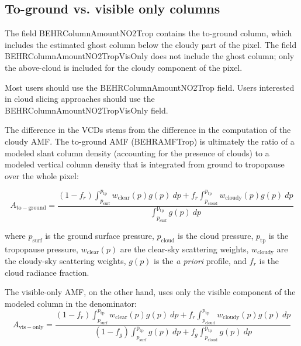 \documentclass[12pt]{article}
\begin{document}
	
	\subsection{To-ground vs. visible only columns}
	The field BEHRColumnAmountNO2Trop contains the to-ground column, which includes the estimated ghost column below the cloudy part of the pixel. The field BEHRColumnAmountNO2TropVisOnly does not include the ghost column; only the above-cloud  is included for the cloudy component of the pixel.
	
	Most users should use the BEHRColumnAmountNO2Trop field. Users interested in cloud slicing approaches should use the BEHRColumnAmountNO2TropVisOnly field. 
	
	The difference in the VCDs stems from the difference in the computation of the cloudy AMF. The to-ground AMF (BEHRAMFTrop) is ultimately the ratio of a modeled slant column density (accounting for the presence of clouds) to a modeled vertical column density that is integrated from ground to tropopause over the whole pixel:
	
	\begin{equation}\label{eqn:total-amf}
	A_{\mathrm{to-ground}} = \frac{(1-f_r) \int_{p_{\mathrm{surf}}}^{p_{\mathrm{tp}}} w_{\mathrm{clear}}(p) g(p) \: dp + f_r \int_{p_{\mathrm{cloud}}}^{p_{\mathrm{tp}}} w_{\mathrm{cloudy}}(p) g(p) \: dp}{\int_{p_{\mathrm{surf}}}^{\mathrm{p_{tp}}} g(p) \: dp}
	\end{equation}
	
	where $p_{\mathrm{surf}}$ is the ground surface pressure, $p_{\mathrm{cloud}}$ is the cloud pressure, $p_{\mathrm{tp}}$ is the tropopause pressure, $w_{\mathrm{clear}}(p)$ are the clear-sky scattering weights, $w_{\mathrm{cloudy}}$ are the cloudy-sky scattering weights, $g(p)$ is the \emph{a priori}  profile, and $f_r$ is the cloud radiance fraction.	
	
	The visible-only AMF, on the other hand, uses only the visible component of the modeled column in the denominator:
	\begin{equation}\label{eqn:vis-amf}
	A_{\mathrm{vis-only}} = \frac{(1-f_r) \int_{p_{\mathrm{surf}}}^{p_{\mathrm{tp}}} w_{\mathrm{clear}}(p) g(p) \: dp + f_r \int_{p_{\mathrm{cloud}}}^{p_{\mathrm{tp}}} w_{\mathrm{cloudy}}(p) g(p) \: dp}%
{(1-f_g)\int_{p_{\mathrm{surf}}}^{\mathrm{p_{tp}}} g(p) \: dp + f_g \int_{p_{\mathrm{cloud}}}^{\mathrm{p_{tp}}} g(p) \: dp}
	\end{equation}
	
\end{document}
